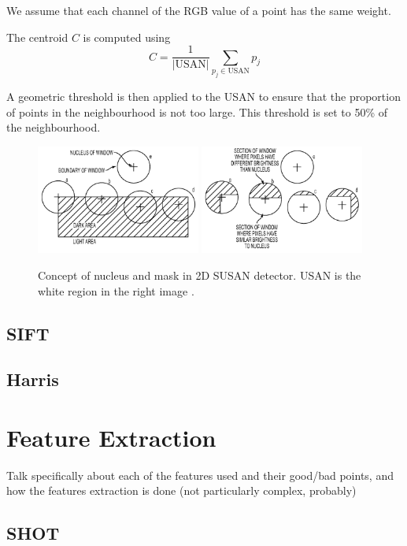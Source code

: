 \documentclass[11pt,a4paper]{kth-mag}
\begin{document}
We assume that each channel of the RGB value of a point has the same weight.

The centroid $C$ is computed using
\begin{equation}
  \label{eq:11}
  C=\frac{1}{\left|\text{USAN}\right|}\sum_{p_j \in \text{USAN}}p_j
\end{equation}

A geometric threshold is then applied to the USAN to ensure that the proportion
of points in the neighbourhood is not too large. This threshold is set to 50\%
of the neighbourhood.
\begin{figure}
  \centering
  \includegraphics[width=0.48\textwidth]{images/susan1}
  \includegraphics[width=0.48\textwidth]{images/susan}
  \caption{Concept of nucleus and mask in 2D SUSAN detector. USAN is the white
    region in the right image \cite{zhang2013susan}.}
  \label{fig:susan_nucleus}
\end{figure}
\subsection{SIFT}
\subsection{Harris}
\section{Feature Extraction}
Talk specifically about each of the features used and their good/bad points, and
how the features extraction is done (not particularly complex, probably)
\subsection{SHOT}
\end{document}
